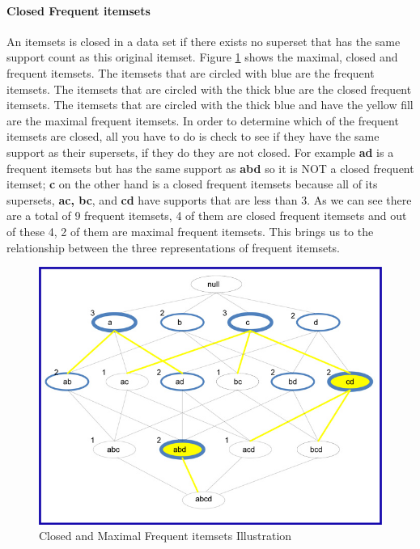 \paragraph{Closed Frequent itemsets }
An itemsets is closed in a data set if there exists no superset that has the same support count as this original itemset.
Figure \ref{fig:closedFISExample} shows the maximal, closed and frequent itemsets. The itemsets that are circled with blue are the frequent itemsets. The itemsets that are circled with the thick blue are the closed frequent itemsets. The itemsets that are circled with the thick blue and have the yellow fill are the maximal frequent itemsets. In order to determine which of the frequent itemsets are closed, all you have to do is check to see if they have the same support as their supersets, if they do they are not closed.
For example \textbf{ad} is a frequent itemsets but has the same support as \textbf{abd} so it is NOT a closed frequent itemset; \textbf{c} on the other hand is a closed frequent itemsets because all of its supersets, \textbf{ac, bc}, and \textbf{cd} have supports that are less than 3.
As we can see there are a total of 9 frequent itemsets, 4 of them are closed frequent itemsets and out of these 4, 2 of them are maximal frequent itemsets. This brings us to the relationship between the three representations of frequent itemsets.

\begin{figure}[H]
  \centering
  \includegraphics[width=\linewidth]{figures/closedFISExample}
  \caption{Closed and Maximal Frequent itemsets Illustration}
  \label{fig:closedFISExample}
\end{figure}


